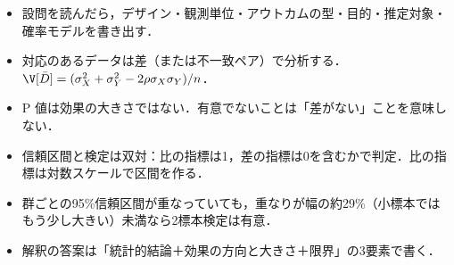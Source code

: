 \begin{summarybox}
\begin{itemize}
\item 設問を読んだら，デザイン・観測単位・アウトカムの型・目的・推定対象・確率モデルを書き出す．
\item 対応のあるデータは差（または不一致ペア）で分析する．$\V[\bar D]=(\sigma_X^2+\sigma_Y^2-2\rho\sigma_X\sigma_Y)/n$．
\item P 値は効果の大きさではない．有意でないことは「差がない」ことを意味しない．
\item 信頼区間と検定は双対：比の指標は1，差の指標は0を含むかで判定．比の指標は対数スケールで区間を作る．
\item 群ごとの95\%信頼区間が重なっていても，重なりが幅の約29\%（小標本ではもう少し大きい）未満なら2標本検定は有意．
\item 解釈の答案は「統計的結論＋効果の方向と大きさ＋限界」の3要素で書く．
\end{itemize}
\end{summarybox}
